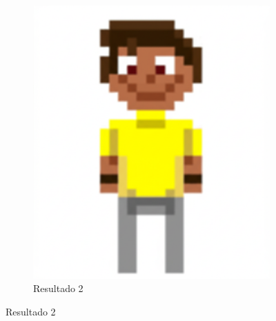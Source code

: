 \begin{figure}[htbp]
\begin{subfigure}{0.3\linewidth}
        \includegraphics[width=1\linewidth]{figs/geminiPro/chat12/01_res2.png}
        \caption{\small Resultado 2}
        \label{fig:geminiProBack1b}
    \end{subfigure}
\end{figure}


